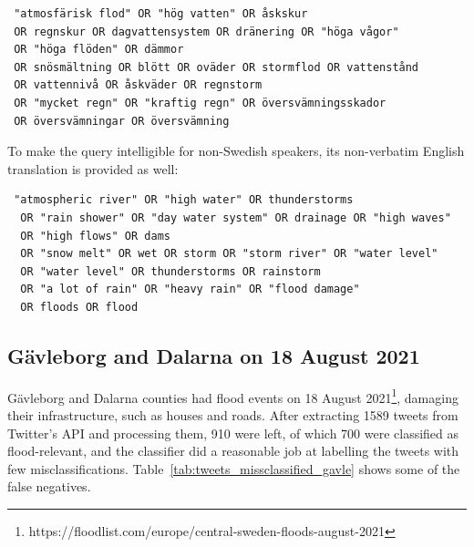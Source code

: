 \begin{verbatim}
 "atmosfärisk flod" OR "hög vatten" OR åskskur
 OR regnskur OR dagvattensystem OR dränering OR "höga vågor"
 OR "höga flöden" OR dämmor
 OR snösmältning OR blött OR oväder OR stormflod OR vattenstånd
 OR vattennivå OR åskväder OR regnstorm
 OR "mycket regn" OR "kraftig regn" OR översvämningsskador
 OR översvämningar OR översvämning
\end{verbatim}

To make the query intelligible for non-Swedish speakers, its non-verbatim English translation is
provided as well:

\begin{verbatim}
 "atmospheric river" OR "high water" OR thunderstorms
  OR "rain shower" OR "day water system" OR drainage OR "high waves"
  OR "high flows" OR dams
  OR "snow melt" OR wet OR storm OR "storm river" OR "water level"
  OR "water level" OR thunderstorms OR rainstorm
  OR "a lot of rain" OR "heavy rain" OR "flood damage"
  OR floods OR flood
\end{verbatim}

\subsection{Gävleborg and Dalarna on 18 August 2021}

Gävleborg and Dalarna counties had flood events on 18 August
2021\footnote{https://floodlist.com/europe/central-sweden-floods-august-2021}, damaging their
infrastructure, such as houses and roads. After extracting 1589 tweets from Twitter's \ac{API} and
processing them, 910 were left, of which 700 were classified as flood-relevant, and the classifier
did a reasonable job at labelling the tweets with few misclassifications.
Table~\ref{tab:tweets_missclassified_gavle} shows some of the false negatives.

